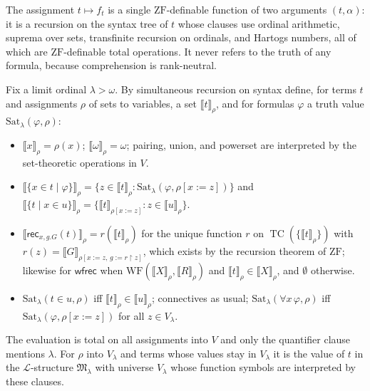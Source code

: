 \documentclass[10pt]{article}
\newcommand{\ZF}{\mathrm{ZF}}
\newcommand{\TC}{\operatorname{TC}}
\newcommand{\Sat}{\mathrm{Sat}}
\newcommand{\WF}{\mathrm{WF}}
\newcommand{\rec}{\mathsf{rec}}
\newcommand{\wfrec}{\mathsf{wfrec}}
\newcommand{\sem}[1]{\llbracket #1\rrbracket}
\newcommand{\Lang}{\mathcal L}
\newcommand{\M}{\mathfrak M}
\begin{document}
The assignment $t\mapsto f_t$ is a single $\ZF$-definable function of
two arguments $(t,\alpha)$: it is a recursion on the syntax tree of $t$
whose clauses use ordinal arithmetic, suprema over sets, transfinite
recursion on ordinals, and Hartogs numbers, all of which are
$\ZF$-definable total operations. It never refers to the truth of any
formula, because comprehension is rank-neutral.

\begin{definition}[evaluation]\label{def:eval}
Fix a limit ordinal $\lambda>\omega$. By simultaneous recursion on syntax
define, for terms $t$ and assignments $\rho$ of sets to variables, a set
$\sem t_\rho$, and for formulas $\varphi$ a truth value $\Sat_\lambda(\varphi,\rho)$:
\begin{itemize}
\item $\sem x_\rho=\rho(x)$; $\sem\omega_\rho=\omega$; pairing, union, and
  powerset are interpreted by the set-theoretic operations in $V$.
\item $\sem{\{x\in t\mid\varphi\}}_\rho=\{z\in\sem t_\rho:\Sat_\lambda(\varphi,\rho[x{:=}z])\}$
  and $\sem{\{t\mid x\in u\}}_\rho=\{\sem t_{\rho[x:=z]}:z\in\sem u_\rho\}$.
\item $\sem{\rec_{x,g.G}(t)}_\rho=r(\sem t_\rho)$ for the unique
  function $r$ on $\TC(\{\sem t_\rho\})$ with
  $r(z)=\sem G_{\rho[x:=z,\,g:=r\restriction z]}$, which exists by the
  recursion theorem of $\ZF$; likewise for $\wfrec$ when
  $\WF(\sem X_\rho,\sem R_\rho)$ and $\sem t_\rho\in\sem X_\rho$, and
  $\emptyset$ otherwise.
\item $\Sat_\lambda(t\in u,\rho)$ iff $\sem t_\rho\in\sem u_\rho$;
  connectives as usual; $\Sat_\lambda(\forall x\,\varphi,\rho)$ iff
  $\Sat_\lambda(\varphi,\rho[x{:=}z])$ for all $z\in V_\lambda$.
\end{itemize}
\end{definition}
The evaluation is total on all assignments into $V$ and only the
quantifier clause mentions $\lambda$. For $\rho$ into $V_\lambda$ and terms
whose values stay in $V_\lambda$ it is the value of $t$ in the
$\Lang$-structure $\M_\lambda$ with universe $V_\lambda$ whose function
symbols are interpreted by these clauses.
\end{document}
